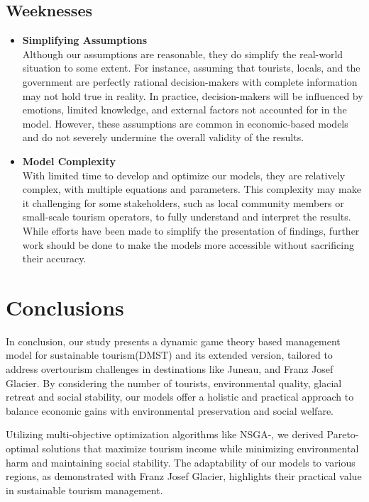 \documentclass{mcmthesis}
\begin{document}
\subsection{Weeknesses}
\begin{itemize}
 \item \textbf{Simplifying Assumptions} \\
 Although our assumptions are reasonable, they do simplify the real-world situation to some extent.
 For instance, assuming that tourists, locals, and the government are perfectly rational decision-makers with complete information may not hold true in reality.
 In practice, decision-makers will be influenced by emotions, limited knowledge, and external factors not accounted for in the model.
 However, these assumptions are common in economic-based models and do not severely undermine the overall validity of the results.
 \item \textbf{Model Complexity} \\
 With limited time to develop and optimize our models, they are relatively complex, with multiple equations and parameters.
 This complexity may make it challenging for some stakeholders, such as local community members or small-scale tourism operators,
 to fully understand and interpret the results.
 While efforts have been made to simplify the presentation of findings, 
 further work should be done to make the models more accessible without sacrificing their accuracy.
\end{itemize}

\section{Conclusions}
In conclusion, our study presents a dynamic game theory based management model for sustainable tourism(DMST) and its extended version, 
tailored to address overtourism challenges in destinations like Juneau, and Franz Josef Glacier. 
By considering the number of tourists, environmental quality, glacial retreat and social stability,
our models offer a holistic and practical approach to balance economic gains with environmental preservation and social welfare.

Utilizing multi-objective optimization algorithms like NSGA-\uppercase\expandafter{}, 
we derived Pareto-optimal solutions that maximize tourism income while minimizing environmental harm and maintaining social stability.
The adaptability of our models to various regions, as demonstrated with Franz Josef Glacier, highlights their practical value in sustainable tourism management.
\end{document}
